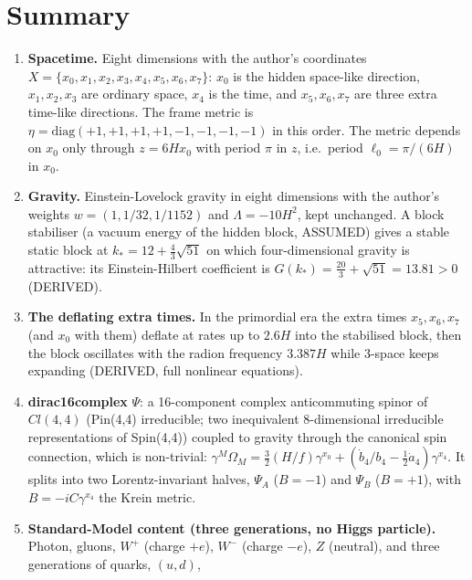 \documentclass[
  10pt,
]{article}
\providecommand{\tightlist}{%
  \setlength{\itemsep}{0pt}\setlength{\parskip}{0pt}}
\begin{document}
\hypertarget{summary}{%
\section{Summary}\label{summary}}

\begin{enumerate}
\def\labelenumi{\arabic{enumi}.}
\tightlist
\item
  \textbf{Spacetime.} Eight dimensions with the author's coordinates
  \(X = \{x_0, x_1, x_2, x_3, x_4, x_5, x_6, x_7\}\): \(x_0\) is the
  hidden space-like direction, \(x_1, x_2, x_3\) are ordinary space,
  \(x_4\) is the time, and \(x_5, x_6, x_7\) are three extra time-like
  directions. The frame metric is
  \(\eta = \mathrm{diag}(+1,+1,+1,+1,-1,-1,-1,-1)\) in this order. The
  metric depends on \(x_0\) only through \(z = 6Hx_0\) with period
  \(\pi\) in \(z\), i.e.~period \(\ell_0 = \pi/(6H)\) in \(x_0\).
\item
  \textbf{Gravity.} Einstein-Lovelock gravity in eight dimensions with
  the author's weights \(w = (1, 1/32, 1/1152)\) and
  \(\Lambda = -10H^2\), kept unchanged. A block stabiliser (a vacuum
  energy of the hidden block, ASSUMED) gives a stable static block at
  \(k_* = 12 + \tfrac43\sqrt{51}\) on which four-dimensional gravity is
  attractive: its Einstein-Hilbert coefficient is
  \(G(k_*) = \tfrac{20}{3} + \sqrt{51} = 13.81 > 0\) (DERIVED).
\item
  \textbf{The deflating extra times.} In the primordial era the extra
  times \(x_5, x_6, x_7\) (and \(x_0\) with them) deflate at rates up to
  \(2.6H\) into the stabilised block, then the block oscillates with the
  radion frequency \(3.387H\) while 3-space keeps expanding (DERIVED,
  full nonlinear equations).
\item
  \textbf{dirac16complex} \(\Psi\): a 16-component complex anticommuting
  spinor of \(Cl(4,4)\) (Pin(4,4) irreducible; two inequivalent
  8-dimensional irreducible representations of Spin(4,4)) coupled to
  gravity through the canonical spin connection, which is non-trivial:
  \(\gamma^M\Omega_M = \tfrac32(H/f)\gamma^{x_0} + (\dot b_4/b_4 - \tfrac12\dot a_4)\gamma^{x_4}\).
  It splits into two Lorentz-invariant halves, \(\Psi_A\) (\(B = -1\))
  and \(\Psi_B\) (\(B = +1\)), with \(B = -iC\gamma^{x_4}\) the Krein
  metric.
\item
  \textbf{Standard-Model content (three generations, no Higgs
  particle).} Photon, gluons, \(W^+\) (charge \(+e\)), \(W^-\) (charge
  \(-e\)), \(Z\) (neutral), and three generations of quarks, \((u, d)\),

\end{enumerate}
\end{document}
